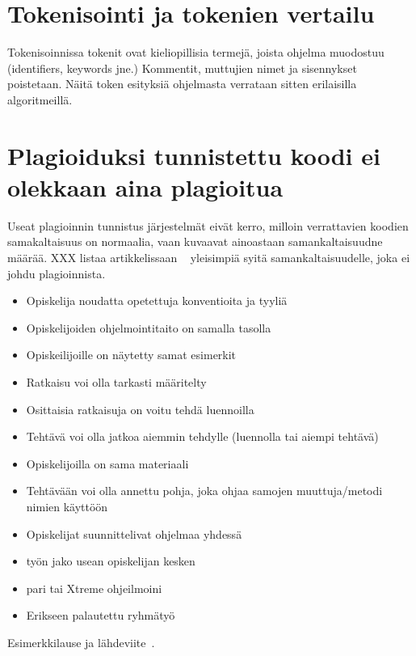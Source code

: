 \documentclass[finnish]{../tktltiki2}
\theoremstyle{definition}
\theoremstyle{remark}
\begin{document}
\section{Tokenisointi ja tokenien vertailu} %
Tokenisoinnissa tokenit ovat kieliopillisia termejä, joista ohjelma muodostuu (identifiers, keywords jne.) Kommentit, muttujien nimet ja sisennykset poistetaan. Näitä token esityksiä ohjelmasta verrataan sitten erilaisilla algoritmeillä.


\section{Plagioiduksi tunnistettu koodi ei olekkaan aina plagioitua}
Useat plagioinnin tunnistus järjestelmät eivät kerro, milloin verrattavien koodien samakaltaisuus on normaalia, vaan kuvaavat ainoastaan samankaltaisuudne määrää. XXX listaa artikkelissaan ~\cite{Mann:2006:SOC:1151869.1151888} yleisimpiä syitä samankaltaisuudelle, joka ei johdu plagioinnista.
\begin{itemize}
\item Opiskelija noudatta opetettuja konventioita ja tyyliä
\item Opiskelijoiden ohjelmointitaito on samalla tasolla
\item Opiskeilijoille on näytetty samat esimerkit
\item Ratkaisu voi olla tarkasti määritelty
\item Osittaisia ratkaisuja on voitu tehdä luennoilla
\item Tehtävä voi olla jatkoa aiemmin tehdylle (luennolla tai aiempi tehtävä)
\item Opiskelijoilla on sama materiaali
\item Tehtävään voi olla annettu pohja, joka ohjaa samojen muuttuja/metodi nimien käyttöön
\item Opiskelijat suunnittelivat ohjelmaa yhdessä
\item työn jako usean opiskelijan kesken
\item pari tai Xtreme ohjeilmoini
\item Erikseen palautettu ryhmätyö
\end{itemize}






Esimerkkilause ja lähdeviite~\cite{esimerkki}.








% 
\end{document}
